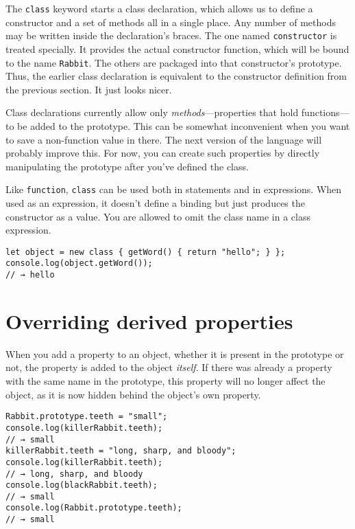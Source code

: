 The \lstinline`class` keyword starts a class declaration, which allows us to define a constructor and a set of methods all in a single place. Any number of methods may be written inside the declaration's braces. The one named \lstinline`constructor` is treated specially. It provides the actual constructor function, which will be bound to the name \lstinline`Rabbit`. The others are packaged into that constructor's prototype. Thus, the earlier class declaration is equivalent to the constructor definition from the previous section. It just looks nicer.

Class declarations currently allow only \emph{methods}—properties that hold functions—to be added to the prototype. This can be somewhat inconvenient when you want to save a non-function value in there. The next version of the language will probably improve this. For now, you can create such properties by directly manipulating the prototype after you've defined the class.

Like \lstinline`function`, \lstinline`class` can be used both in statements and in expressions. When used as an expression, it doesn't define a binding but just produces the constructor as a value. You are allowed to omit the class name in a class expression.

\begin{lstlisting}
let object = new class { getWord() { return "hello"; } };
console.log(object.getWord());
// → hello
\end{lstlisting}
\noindent

\section{Overriding derived properties}

When you add a property to an object, whether it is present in the prototype or not, the property is added to the object \emph{itself}. If there was already a property with the same name in the prototype, this property will no longer affect the object, as it is now hidden behind the object's own property.

\begin{lstlisting}
Rabbit.prototype.teeth = "small";
console.log(killerRabbit.teeth);
// → small
killerRabbit.teeth = "long, sharp, and bloody";
console.log(killerRabbit.teeth);
// → long, sharp, and bloody
console.log(blackRabbit.teeth);
// → small
console.log(Rabbit.prototype.teeth);
// → small
\end{lstlisting}
\noindent{}

